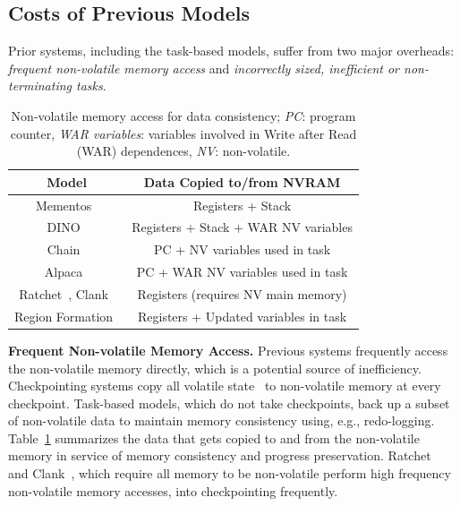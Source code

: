 \subsection{Costs of Previous Models}
\label{sec:cost_task-based}

Prior systems, including the task-based models, suffer from two major overheads:
{\em frequent non-volatile memory access} and {\em incorrectly sized, inefficient or non-terminating tasks}.

\begin{table}
	\centering
	\footnotesize
	\begin{tabular}{|c|c|}
		\hline
		Model & Data Copied to/from NVRAM \\
		\hline\hline
		Mementos~\cite{mementos}	& Registers + Stack     \\
		DINO~\cite{dino}	& Registers + Stack + WAR NV variables \\%
		Chain~\cite{chain}	& PC + NV variables used in task\\
		Alpaca~\cite{alpaca}	& PC + WAR NV variables used in task\\
		Ratchet~\cite{ratchet}, Clank~\cite{hicks_isca_2017} & Registers (requires NV main memory) \\
		Region Formation~\cite{baghsorkhi_cgo_2018} & Registers + Updated variables in task \\
		\hline
	\end{tabular}
	\caption{Non-volatile memory access for data consistency; \emph{PC}: program counter, \emph{WAR variables}: variables involved in Write after Read (WAR) dependences, \emph{NV}: non-volatile.}
	\label{table:chechpoint_comparison}
\end{table}


\textbf{Frequent Non-volatile Memory Access.} 
Previous systems frequently access the non-volatile memory directly, which 
is a potential source of inefficiency.  Checkpointing systems copy all volatile
state~\cite{dino, mementos, ratchet, hicks_isca_2017} to non-volatile memory at
every checkpoint.  Task-based models, which do not take checkpoints, back up a
subset of non-volatile data to maintain memory consistency using, e.g.,
redo-logging.  Table~\ref{table:chechpoint_comparison} summarizes the data that
gets copied to and from the non-volatile memory in service of memory
consistency and progress preservation.  Ratchet~\cite{ratchet} and
Clank~\cite{hicks_isca_2017}, which require all memory to be non-volatile
perform high frequency non-volatile memory accesses, into checkpointing
frequently.

